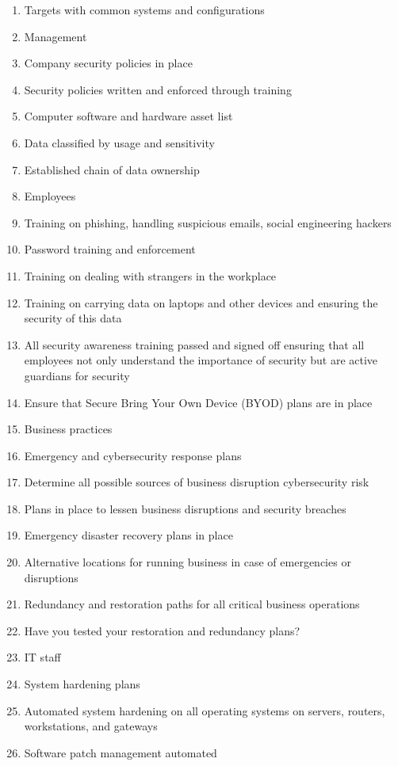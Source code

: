 {\begin{enumerate}
	\item Targets with common systems and configurations
\item Management
\item Company security policies in place
\item Security policies written and enforced through training
\item Computer software and hardware asset list
\item Data classified by usage and sensitivity
\item Established chain of data ownership
\item Employees
\item Training on phishing, handling suspicious emails, social engineering hackers
\item Password training and enforcement
\item Training on dealing with strangers in the workplace
\item Training on carrying data on laptops and other devices and ensuring the security
of this data
\item All security awareness training passed and signed off ensuring that all employees
not only understand the importance of security but are active guardians for
security
\item Ensure that Secure Bring Your Own Device (BYOD) plans are in place
\item Business practices
\item Emergency and cybersecurity response plans
\item Determine all possible sources of business disruption cybersecurity risk
\item Plans in place to lessen business disruptions and security breaches
\item Emergency disaster recovery plans in place
\item Alternative locations for running business in case of emergencies or disruptions
\item Redundancy and restoration paths for all critical business operations
\item Have you tested your restoration and redundancy plans?
\item IT staff
\item System hardening plans
\item Automated system hardening on all operating systems on servers, routers,
workstations, and gateways
\item Software patch management automated

\end{enumerate}}
